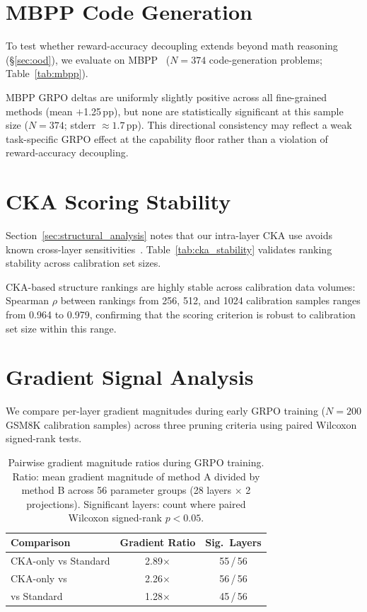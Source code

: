 \section{MBPP Code Generation}
\label{sec:appendix_mbpp}

To test whether reward-accuracy decoupling extends beyond math reasoning (\S\ref{sec:ood}), we evaluate on MBPP~\citep{austin2021mbpp} ($N{=}374$ code-generation problems; Table~\ref{tab:mbpp}).



MBPP GRPO deltas are uniformly slightly positive across all fine-grained methods (mean $+$1.25\,pp), but none are statistically significant at this sample size ($N{=}374$; stderr ${\approx}1.7$\,pp).
This directional consistency may reflect a weak task-specific GRPO effect at the capability floor rather than a violation of reward-accuracy decoupling.

\section{CKA Scoring Stability}
\label{sec:appendix_cka_stability}

Section~\ref{sec:structural_analysis} notes that our intra-layer CKA use avoids known cross-layer sensitivities~\citep{davari2023cka,klabunde_similarity_survey_2023}. Table~\ref{tab:cka_stability} validates ranking stability across calibration set sizes.



CKA-based structure rankings are highly stable across calibration data volumes: Spearman $\rho$ between rankings from 256, 512, and 1024 calibration samples ranges from 0.964 to 0.979, confirming that the scoring criterion is robust to calibration set size within this range.

\section{Gradient Signal Analysis}
\label{sec:appendix_gradient}

We compare per-layer gradient magnitudes during early GRPO training ($N{=}200$ GSM8K calibration samples) across three pruning criteria using paired Wilcoxon signed-rank tests.

\begin{table}[h]
\centering
\small
\caption{Pairwise gradient magnitude ratios during GRPO training. Ratio: mean gradient magnitude of method A divided by method B across 56 parameter groups (28 layers $\times$ 2 projections). Significant layers: count where paired Wilcoxon signed-rank $p{<}0.05$.}
\label{tab:gradient_flow}
\begin{tabular}{@{}lcc@{}}
\toprule
Comparison & Gradient Ratio & Sig.\ Layers \\
\midrule
CKA-only vs Standard & 2.89$\times$ & 55\,/\,56 \\
CKA-only vs \rasp{} & 2.26$\times$ & 56\,/\,56 \\
\rasp{} vs Standard & 1.28$\times$ & 45\,/\,56 \\
\bottomrule
\end{tabular}
\end{table}

